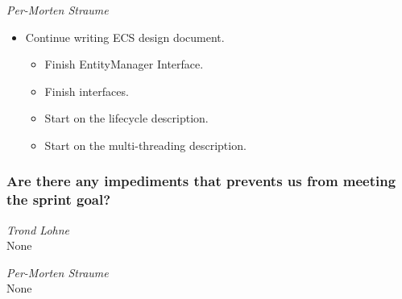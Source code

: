 \documentclass{article}
\begin{document}
\noindent\textit{Per-Morten Straume}
\begin{itemize}
	\item 
	Continue writing ECS design document.
    \begin{itemize}
        \item
        Finish EntityManager Interface.

        \item
        Finish interfaces.
        
        \item
        Start on the lifecycle description.

        \item
        Start on the multi-threading description.
    \end{itemize}
\end{itemize}


\subsubsection*{Are there any impediments that prevents us from meeting the sprint goal?}

\noindent\textit{Trond Lohne}\\
None

\medskip

\noindent\textit{Per-Morten Straume}\\
None
\end{document}
